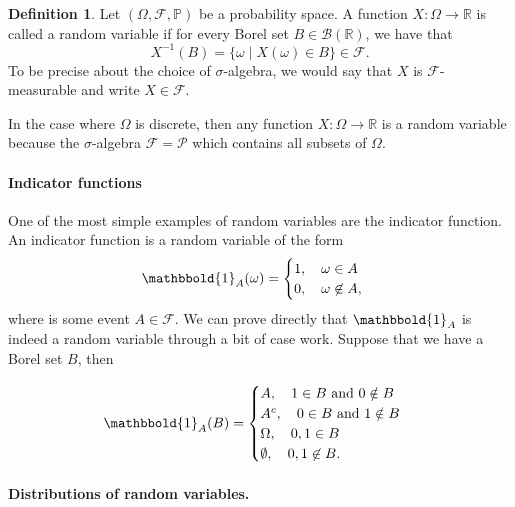 \documentclass[12pt]{article}
\newcommand{\bbR}{\mathbb{R}}
\newcommand{\calF}{\mathcal{F}}
\newcommand{\Prob}{\mathbb{P}}
\newcommand{\ind}{\mathbbold{1}}
\theoremstyle{definition}
\newtheorem{defn}[thm]{Definition}
\theoremstyle{remark}
\numberwithin{equation}{section}
\begin{document}
\begin{defn}
  Let $(\Omega, \calF, \Prob)$ be a probability space. A function $X\colon \Omega \to \bbR$ is called a random variable if for every Borel set $B\in \mathcal{B}(\bbR)$, we have that
  \begin{equation}
    X^{-1}(B) = \{ \omega \mid X(\omega) \in B\} \in \calF.
  \end{equation}
  To be precise about the choice of $\sigma$-algebra, we would say that $X$ is $\calF$-measurable and write $X \in \calF$.
\end{defn}

In the case where $\Omega$ is discrete, then any function $X\colon \Omega \to \bbR$ is a random variable because the $\sigma$-algebra $\calF = \mathcal{P}$ which contains all subsets of $\Omega$. 

\paragraph{Indicator functions}%
\label{par:indicator_functions}
 One of the most simple examples of random variables are the indicator function. An indicator function is a random variable of the form
 \begin{equation}
   \ind_A(\omega) = \begin{cases} 1, \quad \omega \in A \\
     0, \quad \omega \not\in A,
   \end{cases}
 \end{equation}
 where is some event $A\in\calF$. We can prove directly that $\ind_A$ is indeed a random variable through a bit of case work. Suppose that we have a Borel set $B$, then

 \begin{equation}
   \ind_A(B) = \begin{cases}
     A, \quad 1\in B \text{ and } 0 \notin B \\
     A^c, \quad 0 \in B \text{ and } 1\notin B \\
     \Omega, \quad 0,1 \in B \\
    \emptyset, \quad 0,1\not\in B.
   \end{cases}
 \end{equation}

\paragraph{Distributions of random variables.}%
\label{par:distributions}
\end{document}
